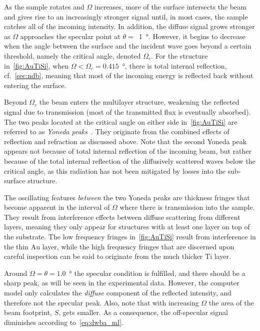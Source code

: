 \documentclass[10pt,twoside, b5paper,pdftex]{report}
\newcommand{\chem}[1]{\ensuremath{\mathrm{#1}}}
\begin{document}
As the sample rotates and $\Omega$ increases, more of the surface intersects the beam and gives rise to an increasingly stronger signal until, in most cases, the sample catches all of the incoming intensity. In addition, the diffuse signal grows stronger as $\Omega$ approaches the specular point at $\theta =$~\SI{1}{\degree}. However, it begins to decrease when the angle between the surface and the incident wave goes beyond a certain threshold, namely the critical angle, denoted $\Omega_{c}$.  For the structure in~\cref{fig:AuTiSi}, when $\Omega < \Omega_{c} = 0.415$~\si{\degree}, there is total internal reflection, cf.~\cref{sec:ndb}, meaning that most of the incoming energy is reflected back without entering the surface. %


Beyond $\Omega_{c}$ the beam enters the multilayer structure, weakening the reflected signal due to transmission (most of the transmitted flux is eventually absorbed). The two peaks located at the critical angle on either side in~\cref{fig:AuTiSi} are referred to as {\it Yoneda peaks}~\cite{YONEDA}. They originate from the combined effects of reflection and refraction as discussed above. Note that the second Yoneda peak appears not because of total internal reflection of the  incoming beam, but rather because of the total internal reflection of the diffusively scattered waves below the critical angle, as this radiation has not been mitigated by losses into the sub-surface structure.  

The oscillating features {\it between} the two Yoneda peaks are thickness fringes that become apparent in the interval of $\Omega$ where there is transmission into the sample. They result from interference effects between diffuse scattering from different layers, meaning they  only appear for structures with at least one layer on top of the substrate. The low frequency fringes in~\cref{fig:AuTiSi} result from interference in the thin \chem{Au} layer, while the high frequency fringes that are discerned upon careful inspection can be said to originate from the much thicker \chem{Ti} layer. 

Around $\Omega = \theta = 1.0$~\si{\degree} the specular condition is fulfilled, and there should be a sharp peak, as will be seen in the experimental data. However, the computer model only calculates the {\it diffuse} component of the reflected intensity, and therefore not the specular peak. Also, note that with increasing $\Omega$ the area of the beam footprint, $S$, gets smaller. As a consequence, the off-specular signal diminishes according to~\cref{eq:dwba_ml}. 
\end{document}
